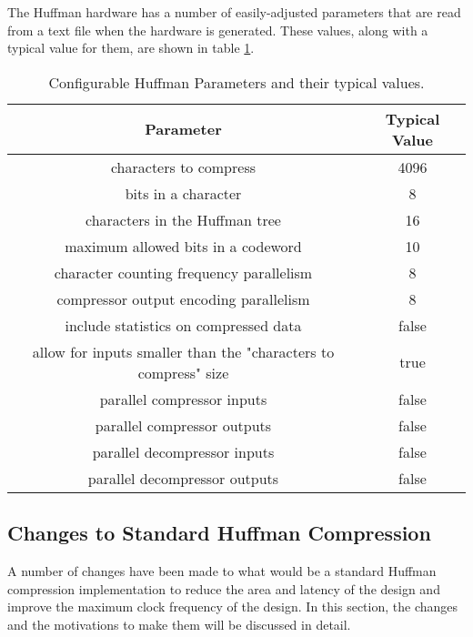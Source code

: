 \documentclass[doublespace,draft,nopageskip]{VTthesis} %
\begin{document}
The Huffman hardware has a number of easily-adjusted parameters that are read from a text file when the hardware is generated. These values, along with a typical value for them, are shown in table \ref{tab:huffman-configuration-table}.

\begin{table}[htb]
	\centering
	\caption{Configurable Huffman Parameters and their typical values.}
	\begin{tabular}{|c|c|}
	    \hline
	    Parameter & Typical Value \\
	    \hline
	    characters to compress & 4096 \\
	    \hline
	    bits in a character & 8 \\
	    \hline
	    characters in the Huffman tree & 16 \\
	    \hline
	    maximum allowed bits in a codeword & 10 \\
	    \hline
	    character counting frequency parallelism & 8 \\
	    \hline
	    compressor output encoding parallelism & 8 \\
	    \hline
	    include statistics on compressed data & false \\
	    \hline
	    allow for inputs smaller than the "characters to compress" size & true \\
	    \hline
	    parallel compressor inputs & false \\
	    \hline
	    parallel compressor outputs & false \\
	    \hline
	    parallel decompressor inputs & false \\ 
	    \hline
	    parallel decompressor outputs & false \\
	    \hline
	\end{tabular}
	\label{tab:huffman-configuration-table}
\end{table}

\subsection{Changes to Standard Huffman Compression}\label{ss:changes_to_standard_huffman_compression}
A number of changes have been made to what would be a standard Huffman compression implementation to reduce the area and latency of the design and improve the maximum clock frequency of the design. In this section, the changes and the motivations to make them will be discussed in detail.
\end{document}
